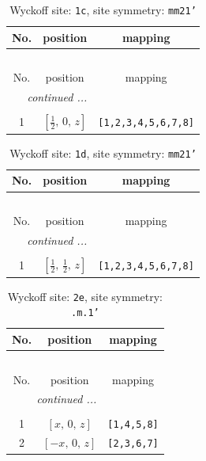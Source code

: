 \documentclass[fleqn,8pt]{jsarticle}
\begin{document}
\begin{longtable}{ccc}
\caption{Wyckoff site: {\tt 1c}, site symmetry: {\tt mm21'}}
 \\
 \hline \hline
No. & position & mapping \\ \hline \endfirsthead

\multicolumn{2}{l}{\tablename\ \thetable{}} \\
 \hline \hline
No. & position & mapping \\ \hline \endhead

 \hline \hline
\multicolumn{2}{r}{\footnotesize\it continued ...} \\ \endfoot

 \hline \hline
\multicolumn{2}{r}{} \\ \endlastfoot

1 & $\left[ \frac{1}{2},\, 0,\, z \right]$ & {\tt [1,2,3,4,5,6,7,8]} \\
\end{longtable}
\renewcommand{\arraystretch}{1.2}
\begin{longtable}{ccc}
\caption{Wyckoff site: {\tt 1d}, site symmetry: {\tt mm21'}}
 \\
 \hline \hline
No. & position & mapping \\ \hline \endfirsthead

\multicolumn{2}{l}{\tablename\ \thetable{}} \\
 \hline \hline
No. & position & mapping \\ \hline \endhead

 \hline \hline
\multicolumn{2}{r}{\footnotesize\it continued ...} \\ \endfoot

 \hline \hline
\multicolumn{2}{r}{} \\ \endlastfoot

1 & $\left[ \frac{1}{2},\, \frac{1}{2},\, z \right]$ & {\tt [1,2,3,4,5,6,7,8]} \\
\end{longtable}
\renewcommand{\arraystretch}{1.2}
\begin{longtable}{ccc}
\caption{Wyckoff site: {\tt 2e}, site symmetry: {\tt .m.1'}}
 \\
 \hline \hline
No. & position & mapping \\ \hline \endfirsthead

\multicolumn{2}{l}{\tablename\ \thetable{}} \\
 \hline \hline
No. & position & mapping \\ \hline \endhead

 \hline \hline
\multicolumn{2}{r}{\footnotesize\it continued ...} \\ \endfoot

 \hline \hline
\multicolumn{2}{r}{} \\ \endlastfoot

1 & $\left[ x,\, 0,\, z \right]$ & {\tt [1,4,5,8]} \\ \hline
2 & $\left[ - x,\, 0,\, z \right]$ & {\tt [2,3,6,7]} \\
\end{longtable}
\end{document}
